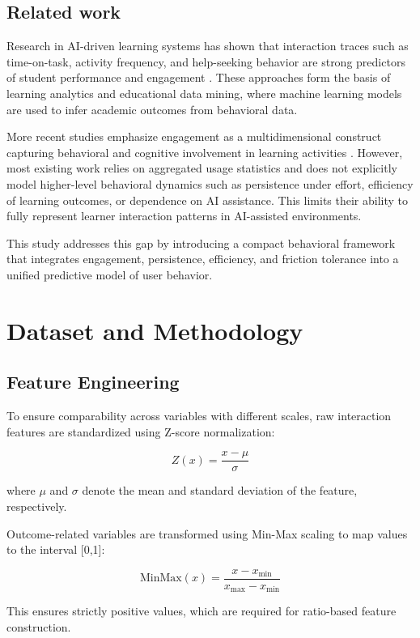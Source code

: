 \documentclass{article}
\begin{document}
\subsection{Related work}

Research in AI-driven learning systems has shown that interaction traces such as time-on-task, activity frequency, and help-seeking behavior are strong predictors of student performance and engagement \cite{siemens2012learning,baker2014educational}. These approaches form the basis of learning analytics and educational data mining, where machine learning models are used to infer academic outcomes from behavioral data.

More recent studies emphasize engagement as a multidimensional construct capturing behavioral and cognitive involvement in learning activities \cite{fredricks2004school}. However, most existing work relies on aggregated usage statistics and does not explicitly model higher-level behavioral dynamics such as persistence under effort, efficiency of learning outcomes, or dependence on AI assistance. This limits their ability to fully represent learner interaction patterns in AI-assisted environments.

This study addresses this gap by introducing a compact behavioral framework that integrates engagement, persistence, efficiency, and friction tolerance into a unified predictive model of user behavior.

\section{Dataset and Methodology}
\subsection{Feature Engineering}
To ensure comparability across variables with different scales, raw interaction features are standardized using Z-score normalization:

\[
Z(x) = \frac{x - \mu}{\sigma}
\]

where \( \mu \) and \( \sigma \) denote the mean and standard deviation of the feature, respectively.

Outcome-related variables are transformed using Min-Max scaling to map values to the interval [0,1]:

\[
\text{MinMax}(x) = \frac{x - x_{\min}}{x_{\max} - x_{\min}}
\]

This ensures strictly positive values, which are required for ratio-based feature construction.
\end{document}
